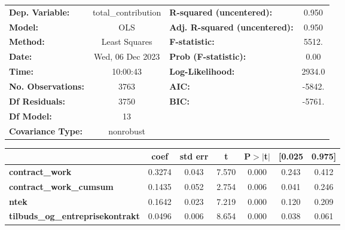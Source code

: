 \begin{center}
\begin{tabular}{lclc}
\toprule
\textbf{Dep. Variable:}                  & total\_contribution & \textbf{  R-squared (uncentered):}      &     0.950   \\
\textbf{Model:}                          &         OLS         & \textbf{  Adj. R-squared (uncentered):} &     0.950   \\
\textbf{Method:}                         &    Least Squares    & \textbf{  F-statistic:       }          &     5512.   \\
\textbf{Date:}                           &   Wed, 06 Dec 2023  & \textbf{  Prob (F-statistic):}          &     0.00    \\
\textbf{Time:}                           &       10:00:43      & \textbf{  Log-Likelihood:    }          &    2934.0   \\
\textbf{No. Observations:}               &          3763       & \textbf{  AIC:               }          &    -5842.   \\
\textbf{Df Residuals:}                   &          3750       & \textbf{  BIC:               }          &    -5761.   \\
\textbf{Df Model:}                       &            13       & \textbf{                     }          &             \\
\textbf{Covariance Type:}                &      nonrobust      & \textbf{                     }          &             \\
\bottomrule
\end{tabular}
\begin{tabular}{lcccccc}
                                         & \textbf{coef} & \textbf{std err} & \textbf{t} & \textbf{P$> |$t$|$} & \textbf{[0.025} & \textbf{0.975]}  \\
\midrule
\textbf{contract\_work}                  &       0.3274  &        0.043     &     7.570  &         0.000        &        0.243    &        0.412     \\
\textbf{contract\_work\_cumsum}          &       0.1435  &        0.052     &     2.754  &         0.006        &        0.041    &        0.246     \\
\textbf{ntek}                            &       0.1642  &        0.023     &     7.219  &         0.000        &        0.120    &        0.209     \\
\textbf{tilbuds\_og\_entreprisekontrakt} &       0.0496  &        0.006     &     8.654  &         0.000        &        0.038    &        0.061     \\

\end{tabular}
\end{center}
